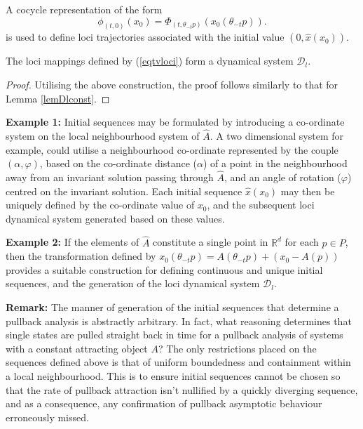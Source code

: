 A cocycle representation of the form
\begin{equation}\label{eqtvloci}
  \phi_{(t, 0)}(x_0) = \Phi_{(t, \theta_{-t}p)}(x_0(\theta_{-t}p)).
\end{equation}
is used to define loci trajectories associated with the initial value $(0,
\hat{x}(x_0))$.

\begin{lemma}
The loci mappings defined by (\ref{eqtvloci}) form a dynamical
system $\mathcal{D}_l$.
\end{lemma}
\begin{proof}
  Utilising the above construction, the proof follows similarly to that for
Lemma \ref{lemDlconst}.
\end{proof}

{\bf Example 1: } Initial sequences may be formulated by introducing a
co-ordinate system on the local neighbourhood system of $\hat{A}$. A two
dimensional system for example, could utilise a neighbourhood co-ordinate
represented by the couple $(\alpha, \varphi)$, based on the
co-ordinate distance ($\alpha$) of a point in the neighbourhood away from an
invariant solution passing through $\hat{A}$, and an angle of rotation
($\varphi$)  centred on the invariant solution. Each initial sequence
$\hat{x}(x_0)$ may then be uniquely defined by the co-ordinate value of $x_0$,
and the subsequent loci dynamical system generated based on these values.

{\bf Example 2: } If the elements of $\hat{A}$ constitute a single point in
$\mathbb{R}^d$ for each $p \in P$, then the transformation defined by
$x_0(\theta_{-t}p) = A(\theta_{-t}p) + (x_0 - A(p))$ provides a suitable
construction for defining continuous and unique initial sequences, and the
generation of the loci dynamical system $\mathcal{D}_l$.

{\bf Remark:} The manner of generation of the initial sequences that determine
a pullback analysis is abstractly arbitrary. In fact, what reasoning determines
that single states are pulled straight back in time for a pullback analysis of
systems with a constant attracting object $A$? The only restrictions placed on
the sequences defined above is that of uniform boundedness and containment
within a local neighbourhood. This is to ensure initial sequences cannot be
chosen so that the rate of pullback attraction isn't nullified by a quickly
diverging sequence, and as a consequence, any confirmation of pullback
asymptotic behaviour erroneously missed.

